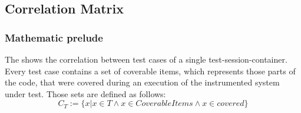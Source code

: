\subsection{Correlation Matrix}
\subsubsection{Mathematic prelude}\label{ui:Mathematic prelude}
The  shows the correlation between test cases of a single test-session-container. Every test case contains a set of coverable items, which represents those parts of the code, that were covered during an execution of the instrumented system under test. Those sets are defined as follows: 
\begin{equation}
C_{T}:= \{ x | x \in T \wedge x \in CoverableItems \wedge x \in covered \}
\end{equation}

